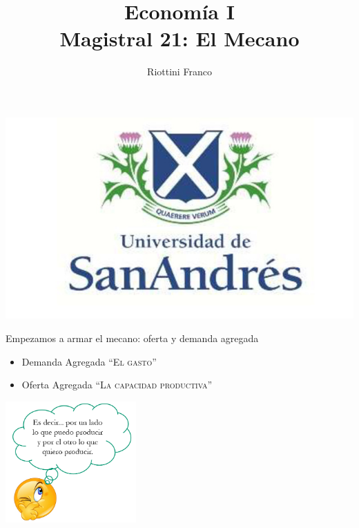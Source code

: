 \documentclass{beamer}
\title[Economía I]{Economía I \vspace{4mm}
\\ Magistral 21: El Mecano}
\date{}
\author[Riottini]{Riottini Franco}
\institute[]{Universidad de San Andrés}
\begin{document}
\begin{frame}
\titlepage
\centering

\includegraphics[scale=0.2]{../Figures/logoUDESA.jpg} 
\end{frame}


\begin{frame}{Empezamos a armar el mecano: oferta y demanda agregada}

    \begin{itemize}
        \item Demanda Agregada \textsc{“El gasto”} \faCartPlus
        \item Oferta Agregada \textsc{“La capacidad productiva”} \faIndustry
    \end{itemize}
    
    \centering\includegraphics[width=5cm]{../Figures/P17b.png}\
\end{frame}
\end{document}
